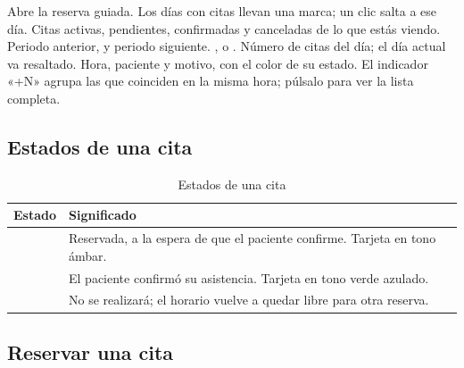 \documentclass[11pt]{article}
\begin{document}
\begin{leyenda}
   Abre la reserva guiada.
   Los días con citas llevan una marca; un clic salta a ese día.
   Citas activas, pendientes, confirmadas y canceladas de lo que estás viendo.
   Periodo anterior,  y periodo siguiente.
   ,  o .
   Número de citas del día; el día actual va resaltado.
   Hora, paciente y motivo, con el color de su estado.
   El indicador «+N» agrupa las que coinciden en la misma hora; púlsalo para ver la lista completa.
\end{leyenda}

\subsection{Estados de una cita}

\begin{table}[H]
\centering\small
\caption{Estados de una cita}\label{tab:estados}
\begin{tabularx}{\linewidth}{@{}P{3.2cm}L@{}}
\toprule
\textbf{Estado} & \textbf{Significado} \\
\midrule
{} & Reservada, a la espera de que el paciente confirme. Tarjeta en tono ámbar. \\
 & El paciente confirmó su asistencia. Tarjeta en tono verde azulado. \\
 & No se realizará; el horario vuelve a quedar libre para otra reserva. \\
\bottomrule
\end{tabularx}
\end{table}

\needspace{0.55\textheight}
\subsection{Reservar una cita}\label{sec:reservar}
\end{document}
